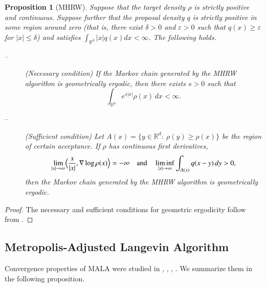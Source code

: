 \documentclass[preprint, 3p, authoryear]{elsarticle}
\providecommand{\eps}{\varepsilon}
\newcommand{\R}{\mathbb R}
\newtheorem{proposition}{Proposition}
\theoremstyle{definition}
\begin{document}
\begin{proposition}[MHRW]\label{MHRW}
Suppose that the target density $\rho$ is strictly positive and continuous. Suppose further that the proposal density
$q$ is strictly positive in some region around zero (that is, there exist
$\delta>0$ and $\eps>0$ such that $q(x)\ge\eps$ for $|x|\leq\delta$) 
and satisfies $\int_{\R^d} |x| q(x) dx < \infty$. The following holds.
\begin{description}
	\item[--] (Necessary condition) 
	If the Markov chain generated by the MHRW algorithm is geometrically ergodic, 
	then there exists $s>0$ such that
	\[
		\int_{\R^d} e^{s|x|} \rho(x) \, dx < \infty.
	\]
	\item[--] (Sufficient condition) 
	Let $A(x) = \{ y\in\R^d: \ \rho(y) \ge  \rho(x) \}$ be the region of certain acceptance.
	If $\rho$ has continuous first derivatives,
	\[
	\lim_{|x|\to\infty} \Bigl\langle \frac{x}{|x|} , \nabla\log \rho(x) \Bigr\rangle= -\infty
	\quad\text{and}\quad
	\liminf_{|x|\to\infty} \int_{A(x)} q(x-y) \, dy > 0,
	\]
	then the Markov chain generated by the MHRW algorithm is geometrically ergodic. 
\end{description}
\end{proposition}
\begin{proof}
The necessary and sufficient conditions for geometric ergodicity
follow from \cite[Corollary 3.4 and Theorem 4.1 correspondingly]{jarnerhansen2000}.
\end{proof}

\subsection{Metropolis-Adjusted Langevin Algorithm}
Convergence properties of  MALA were studied in  \citet{robertstweedie1996}, \citet{ad17}, \citet{dm17}, \cite{brosse2018diffusion}.
We summarize them in the following proposition.
\end{document}
